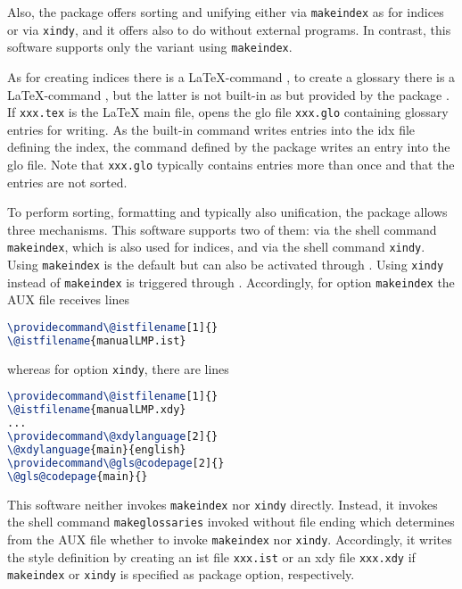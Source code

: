 Also, the package  offers sorting and unifying 
either via \texttt{makeindex} as for indices or via \texttt{xindy}, 
and it offers also to do without external programs. 
In contrast, this software supports only the variant using \texttt{makeindex}. 





As for creating indices there is a \LaTeX-command , 
to create a glossary there is a \LaTeX-command , 
but the latter is not built-in as  
but provided by the package . 
If \texttt{xxx.tex} is the \LaTeX{} main file, 
 opens the glo file \texttt{xxx.glo} 
containing glossary entries for writing. 
As the built-in command  
writes entries into the \gls{idx} file defining the index, 
the command  defined by the package  
writes an entry into the glo file. 
Note that \texttt{xxx.glo} typically contains entries more than once 
and that the entries are not sorted. 

To perform sorting, formatting and typically also unification, 
the package  allows three mechanisms. 
This software supports two of them: 
via the shell command \texttt{makeindex}, which is also used for indices, 
and via the shell command \texttt{xindy}. 
Using \texttt{makeindex} is the default but can also be activated through 
. 
Using \texttt{xindy} instead of \texttt{makeindex} is triggered through 
. 
Accordingly, for option \texttt{makeindex} the AUX file receives lines 
%
\begin{lstlisting}[language=TeX]
\providecommand\@istfilename[1]{}
\@istfilename{manualLMP.ist}
\end{lstlisting}
%
whereas for option \texttt{xindy}, there are lines 
%
\begin{lstlisting}[language=TeX]
\providecommand\@istfilename[1]{}
\@istfilename{manualLMP.xdy}
...
\providecommand\@xdylanguage[2]{}
\@xdylanguage{main}{english}
\providecommand\@gls@codepage[2]{}
\@gls@codepage{main}{}
\end{lstlisting}



This software neither invokes \texttt{makeindex} nor \texttt{xindy} directly. 
Instead, it invokes the shell command \texttt{makeglossaries}
invoked without file ending  
which determines from the AUX file 
whether to invoke \texttt{makeindex} nor \texttt{xindy}. 
Accordingly, it writes the style definition 
by creating an ist file \texttt{xxx.ist} or an xdy file \texttt{xxx.xdy} 
if \texttt{makeindex} or \texttt{xindy} is specified as package option, 
respectively. 

